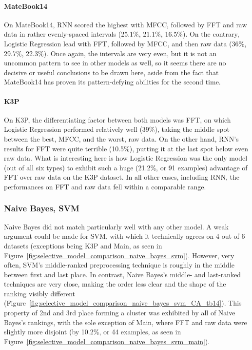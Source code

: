 \documentclass[../main.tex]{subfiles}
\begin{document}
\paragraph{MateBook14}
On MateBook14, RNN scored the highest with MFCC, followed by FFT and raw data in rather evenly-spaced intervals (25.1\%, 21.1\%, 16.5\%). On the contrary, Logistic Regression lead with FFT, followed by MFCC, and then raw data (36\%, 29.7\%, 22.3\%). Once again, the intervals are very even, but it is not an uncommon pattern to see in other models as well, so it seems there are no decisive or useful conclusions to be drawn here, aside from the fact that MateBook14 has proven its pattern-defying abilities for the second time.

\paragraph{K3P}
On K3P, the differentiating factor between both models was FFT, on which Logistic Regression performed relatively well (39\%), taking the middle spot between the best, MFCC, and the worst, raw data. On the other hand, RNN's results for FFT were quite terrible (10.5\%), putting it at the last spot below even raw data. What is interesting here is how Logistic Regression was the only model (out of all six types) to exhibit such a huge (21.2\%, or 91 examples) advantage of FFT over raw data on the K3P dataset. In all other cases, including RNN, the performances on FFT and raw data fell within a comparable range.

\subsubsection{Naive Bayes, SVM}
Naive Bayes did not match particularly well with any other model. A weak argument could be made for SVM, with which it technically agrees on 4 out of 6 datasets (exceptions being K3P and Main, as seen in Figure~\ref{fig:selective_model_comparison_naive_bayes_svm}). However, very often, SVM's middle-ranked preprocessing technique is roughly in the middle between first and last place. In contrast, Naive Bayes's middle- and last-ranked techniques are very close, making the order less clear and the shape of the ranking visibly different (Figure~\ref{fig:selective_model_comparison_naive_bayes_svm_CA_tb14}).
This property of 2nd and 3rd place forming a cluster was exhibited by all of Naive Bayes's rankings, with the sole exception of Main, where FFT and raw data were slightly more disjoint (by 10.2\%, or 44 examples, as seen in Figure~\ref{fig:selective_model_comparison_naive_bayes_svm_main}).
\end{document}

